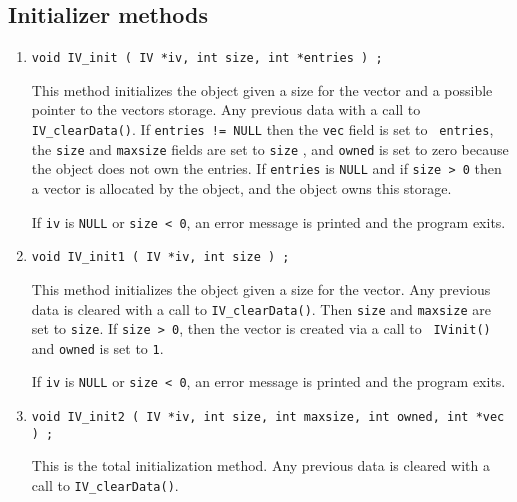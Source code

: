 \subsection{Initializer methods}
\label{subsection:IV:proto:initializers}
\par
\begin{enumerate}
\item
\begin{verbatim}
void IV_init ( IV *iv, int size, int *entries ) ;
\end{verbatim}
This method initializes the object given a size for the vector
and a possible pointer to the vectors storage.
Any previous data with a call to {\tt IV\_clearData()}.
If {\tt entries != NULL} then the {\tt vec} field is set to {\tt
entries}, the {\tt size} and {\tt maxsize} fields are set
to {\tt size} , and {\tt owned} is set to zero
because the object does not own the entries.
If {\tt entries} is {\tt NULL} and if {\tt size > 0} then 
a vector is allocated by the object, and the object owns this storage.
\par {}
If {\tt iv} is {\tt NULL} or {\tt size < 0},
an error message is printed and the program exits.
\item
\begin{verbatim}
void IV_init1 ( IV *iv, int size ) ;
\end{verbatim}
This method initializes the object given a size for the vector.
Any previous data is cleared with a call to {\tt IV\_clearData()}.
Then {\tt size} and {\tt maxsize} are set to {\tt size}.
If {\tt size > 0}, then the vector is created via a call to {\tt
IVinit()} and {\tt owned} is set to {\tt 1}.
\par {}
If {\tt iv} is {\tt NULL} or {\tt size < 0},
an error message is printed and the program exits.
\item
\begin{verbatim}
void IV_init2 ( IV *iv, int size, int maxsize, int owned, int *vec ) ;
\end{verbatim}
This is the total initialization method.
Any previous data is cleared with a call to {\tt IV\_clearData()}.

\end{enumerate}
